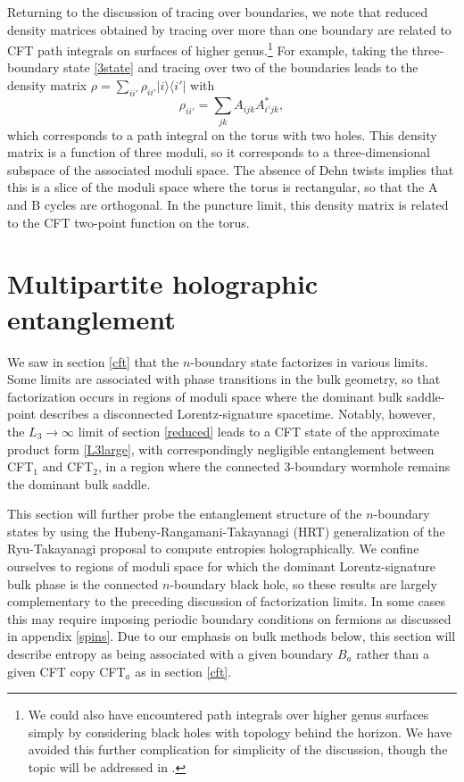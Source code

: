 \documentclass[12pt]{article}
\newcommand{\be}{\begin{equation}}
\newcommand{\ee}{\end{equation}}
\numberwithin{equation}{section}
\begin{document}
Returning to the discussion of tracing over boundaries, we note that reduced density matrices obtained by tracing over more than one boundary are related to CFT path integrals on surfaces of higher genus.\footnote{We could also have encountered path integrals over higher genus surfaces simply by considering black holes with topology behind the horizon.  We have avoided this further complication for simplicity of the discussion, though the topic will be addressed in \cite{MRta}.} For example, taking the three-boundary state \eqref{3state} and tracing over two of the boundaries leads to the density matrix $\rho = \sum_{i i'} \rho_{i i'} |i \rangle \langle i'|$ with
%
\be
\rho_{i i'} = \sum_{jk} A_{ijk} A^*_{i' jk},
\ee
%
which corresponds to a path integral on the torus with two holes. This density matrix is a function of three moduli, so it corresponds to a three-dimensional subspace of the associated moduli space. The absence of Dehn twists implies that this is a slice of the moduli space where the torus is rectangular, so that the A and B cycles are orthogonal. In the puncture limit, this density matrix is related to the CFT two-point function on the torus.


%
\section{Multipartite holographic entanglement}
\label{entang}
%

We saw in section \ref{cft} that the $n$-boundary state factorizes in various limits. Some limits are associated with phase transitions in the bulk geometry, so that factorization occurs in regions of moduli space where the dominant bulk saddle-point describes a disconnected Lorentz-signature spacetime. Notably, however, the $L_3 \rightarrow \infty$ limit of section \ref{reduced} leads to
a CFT state of the approximate product form \eqref{L3large}, with correspondingly negligible entanglement between CFT${}_1$ and CFT${}_2$,  in a region where the connected 3-boundary wormhole remains the dominant bulk saddle.


This section will further probe the entanglement structure of the $n$-boundary states by using the Hubeny-Rangamani-Takayanagi (HRT) generalization \cite{Hubeny:2007xt}  of the Ryu-Takayanagi proposal \cite{Ryu:2006bv} to compute entropies holographically.  We confine ourselves to regions of moduli space for which the dominant Lorentz-signature bulk phase is the connected $n$-boundary black hole, so these results are largely complementary to the preceding discussion of factorization limits.  In some cases this may require imposing periodic boundary conditions on fermions as discussed in appendix \ref{spins}.  Due to our emphasis on bulk methods below, this section will describe entropy as being associated with a given boundary $B_a$ rather than a given CFT copy CFT${}_a$ as in section \ref{cft}.
\end{document}
